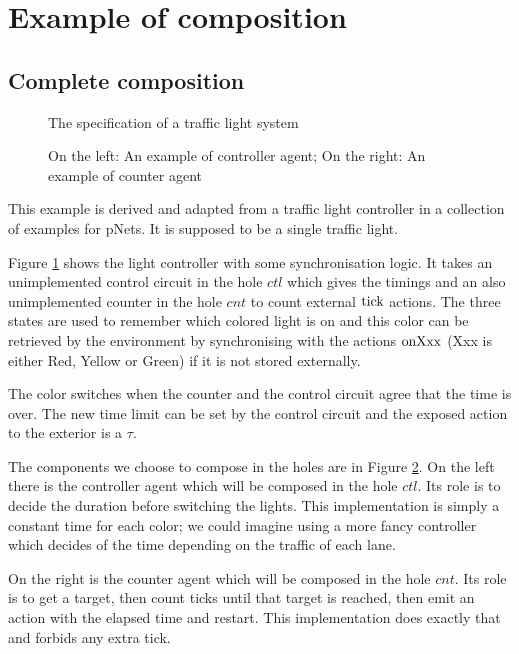 \documentclass{article}
\begin{document}
\section{Example of composition}

\subsection{Complete composition}\label{apx:composition}
\begin{figure}[h]
\centering

\caption{The specification of a traffic light system}
\label{fig:tls}
\end{figure}
\begin{figure}
\centering

\vrule

\caption{On the left: An example of controller agent; On the right: An example of counter agent}
\label{fig:tlh}
\end{figure}
This example is derived and adapted from a traffic light controller in a collection of examples for pNets.
It is supposed to be a single traffic light.

Figure \ref{fig:tls} shows the light controller with some synchronisation logic.
It takes an unimplemented control circuit in the hole \(ctl\) which gives the timings and an also unimplemented counter in the hole \(cnt\) to count external \(\mathrm{tick}\) actions.
The three states are used to remember which colored light is on and this color can be retrieved by the environment by synchronising with the actions \(\mathrm{onXxx}\) (Xxx is either Red, Yellow or Green) if it is not stored externally.

The color switches when the counter and the control circuit agree that the time is over.
The new time limit can be set by the control circuit and the exposed action to the exterior is a \(\tau\).

The components we choose to compose in the holes are in Figure \ref{fig:tlh}.
On the left there is the controller agent which will be composed in the hole \(ctl\).
Its role is to decide the duration before switching the lights.
This implementation is simply a constant time for each color; we could imagine using a more fancy controller which decides of the time depending on the traffic of each lane.

On the right is the counter agent which will be composed in the hole \(cnt\).
Its role is to get a target, then count ticks until that target is reached, then emit an action with the elapsed time and restart.
This implementation does exactly that and forbids any extra tick.
\end{document}
